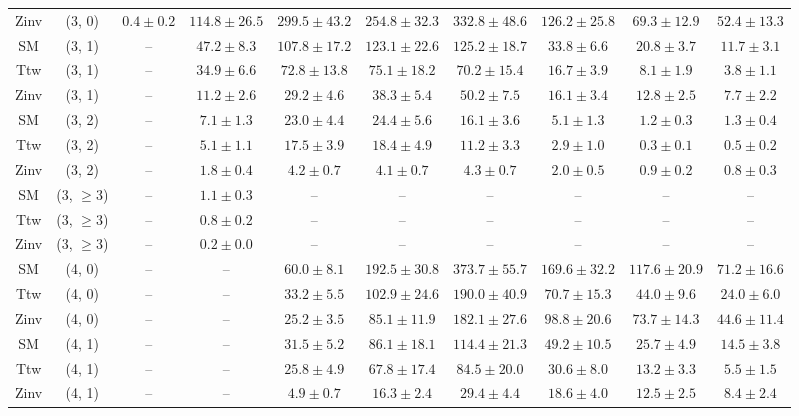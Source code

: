 \begin{table}[h!]
{\begin{tabular}{cccccccccc}
	Zinv & (3, 0) & $0.4\pm 0.2$ & $114.8\pm 26.5$ & $299.5\pm 43.2$ & $254.8\pm 32.3$ & $332.8\pm 48.6$ & $126.2\pm 25.8$ & $69.3\pm 12.9$ & $52.4\pm 13.3$ \\[0.5ex] 
	SM & (3, 1) & -- & $47.2\pm 8.3$ & $107.8\pm 17.2$ & $123.1\pm 22.6$ & $125.2\pm 18.7$ & $33.8\pm 6.6$ & $20.8\pm 3.7$ & $11.7\pm 3.1$ \\[0.5ex] 
	Ttw & (3, 1) & -- & $34.9\pm 6.6$ & $72.8\pm 13.8$ & $75.1\pm 18.2$ & $70.2\pm 15.4$ & $16.7\pm 3.9$ & $8.1\pm 1.9$ & $3.8\pm 1.1$ \\[0.5ex] 
	Zinv & (3, 1) & -- & $11.2\pm 2.6$ & $29.2\pm 4.6$ & $38.3\pm 5.4$ & $50.2\pm 7.5$ & $16.1\pm 3.4$ & $12.8\pm 2.5$ & $7.7\pm 2.2$ \\[0.5ex] 
	SM & (3, 2) & -- & $7.1\pm 1.3$ & $23.0\pm 4.4$ & $24.4\pm 5.6$ & $16.1\pm 3.6$ & $5.1\pm 1.3$ & $1.2\pm 0.3$ & $1.3\pm 0.4$ \\[0.5ex] 
	Ttw & (3, 2) & -- & $5.1\pm 1.1$ & $17.5\pm 3.9$ & $18.4\pm 4.9$ & $11.2\pm 3.3$ & $2.9\pm 1.0$ & $0.3\pm 0.1$ & $0.5\pm 0.2$ \\[0.5ex] 
	Zinv & (3, 2) & -- & $1.8\pm 0.4$ & $4.2\pm 0.7$ & $4.1\pm 0.7$ & $4.3\pm 0.7$ & $2.0\pm 0.5$ & $0.9\pm 0.2$ & $0.8\pm 0.3$ \\[0.5ex] 
	SM & (3, $\ge3$) & -- & $1.1\pm 0.3$ & -- & -- & -- & -- & -- & -- \\[0.5ex] 
	Ttw & (3, $\ge3$) & -- & $0.8\pm 0.2$ & -- & -- & -- & -- & -- & -- \\[0.5ex] 
	Zinv & (3, $\ge3$) & -- & $0.2\pm 0.0$ & -- & -- & -- & -- & -- & -- \\[0.5ex] 
	SM & (4, 0) & -- & -- & $60.0\pm 8.1$ & $192.5\pm 30.8$ & $373.7\pm 55.7$ & $169.6\pm 32.2$ & $117.6\pm 20.9$ & $71.2\pm 16.6$ \\[0.5ex] 
	Ttw & (4, 0) & -- & -- & $33.2\pm 5.5$ & $102.9\pm 24.6$ & $190.0\pm 40.9$ & $70.7\pm 15.3$ & $44.0\pm 9.6$ & $24.0\pm 6.0$ \\[0.5ex] 
	Zinv & (4, 0) & -- & -- & $25.2\pm 3.5$ & $85.1\pm 11.9$ & $182.1\pm 27.6$ & $98.8\pm 20.6$ & $73.7\pm 14.3$ & $44.6\pm 11.4$ \\[0.5ex] 
	SM & (4, 1) & -- & -- & $31.5\pm 5.2$ & $86.1\pm 18.1$ & $114.4\pm 21.3$ & $49.2\pm 10.5$ & $25.7\pm 4.9$ & $14.5\pm 3.8$ \\[0.5ex] 
	Ttw & (4, 1) & -- & -- & $25.8\pm 4.9$ & $67.8\pm 17.4$ & $84.5\pm 20.0$ & $30.6\pm 8.0$ & $13.2\pm 3.3$ & $5.5\pm 1.5$ \\[0.5ex] 
	Zinv & (4, 1) & -- & -- & $4.9\pm 0.7$ & $16.3\pm 2.4$ & $29.4\pm 4.4$ & $18.6\pm 4.0$ & $12.5\pm 2.5$ & $8.4\pm 2.4$ \\[0.5ex] 

\end{tabular}}
\end{table}
